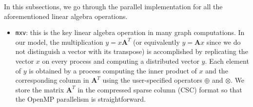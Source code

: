 \documentclass{sokendai_thesis} %
\begin{document}
In this subsections, we go through the parallel implementation for all the aforementioned linear algebra operations.
\begin{itemize}
\item \texttt{mxv}: this is the key linear algebra operation in many graph computations.
In our model, the multiplication $y=x\mathbf{A}^T$ (or equivalently $y=\mathbf{A}x$ since we do not distinguish a vector with its transpose) is accomplished by replicating the vector $x$ on every process and computing a distributed vector $y$.
Each element of $y$ is obtained by a process computing the inner product of $x$ and the corresponding column in $\mathbf{A}^T$ using the user-specified operators $\oplus$ and $\otimes$.
We store the matrix $\mathbf{A}^T$ in the compressed sparse column (CSC) format so that the OpenMP parallelism is straightforward.





\end{itemize}
\end{document}
